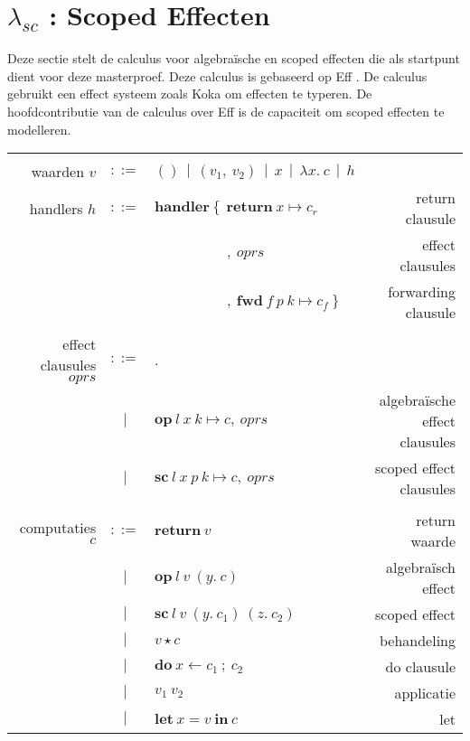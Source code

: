 \section{\texorpdfstring{$\lambda_{sc}$ :}{} Scoped Effecten} \label{hoofdstuk:startpuntScoped}
Deze sectie stelt de calculus voor algebraïsche en scoped effecten \cite{Bosman2022} die als startpunt dient voor deze masterproef. Deze calculus is gebaseerd op Eff \cite{Bauer2015}. De calculus gebruikt een effect systeem zoals Koka \cite{Leijen2017} om effecten te typeren. De hoofdcontributie van de calculus over Eff is de capaciteit om scoped effecten te modelleren.
\begin{table}
    \centering
    \begin{tabular}{|r c l r|}
    \hline
         & & & \\ 
         waarden $v$ & $::=$ & $() \: \: | \: \: (v_{1}, \: v_{2} ) \: \: | \: \: x \: \: | \: \: \lambda x . \: c \: \: | \: \: h$ & \\
         handlers $h$ & $::=$ & $\textbf{handler} \: \{ \: \: \textbf{return} \: x \mapsto c_{r}$ & return clausule\\
         & & $\qquad \qquad \quad , \: oprs$ & effect  clausules \\
         & & $\qquad \qquad \quad , \: \textbf{fwd} \: f \: p \: k \mapsto c_{f} \: \} $ & forwarding clausule \\
         & & & \\
          effect clausules $oprs$ & $::=$ & . & \\ 
          & $|$ & $\textbf{op} \: l \: x \: k \mapsto c, \: oprs$ & algebraïsche effect clausules \\
           & $|$ & $\textbf{sc} \: l \: x \: p \: k \mapsto c, \: oprs$ & scoped effect clausules \\
        & & & \\
         computaties $c$ & $::=$ & $\textbf{return} \: v$ & return waarde \\
          & $|$ & $\textbf{op} \: l \: v \: (y. \: c)$ & algebraïsch effect \\
          & $|$ & $\textbf{sc} \: l \: v \: (y. \: c_{1}) \: (z. \: c_{2})$ & scoped effect \\
          & $|$ & $v \star c$ & behandeling \\
          & $|$ & $\textbf{do} \: x \leftarrow c_{1}\:; \: c_{2}$ & do clausule \\
          & $|$ & $v_{1} \: v_{2}$ & applicatie \\
          & $|$ & $\textbf{let} \: x = v \: \textbf{in} \: c$ & let \\

\end{tabular}
\end{table}
